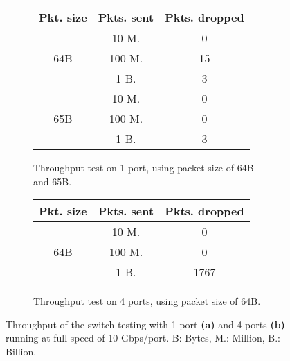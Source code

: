 \begin{figure}[h]
	\centering
	\begin{subfigure}[t]{0.45\textwidth}
		\begin{tabular}{|c|c|c|}
			\hline
			Pkt. size            & \multicolumn{1}{c|}{Pkts. sent} & \multicolumn{1}{c|}{Pkts. dropped} \\ \hline
			\multirow{3}{*}{64B} & 10 M.                             & 0                                  \\ \cline{2-3} 
			& 100 M.                            & 15                                 \\ \cline{2-3} 
			& 1 B.                              & 3                                  \\ \hline
			\multirow{3}{*}{65B} & 10 M.                             & 0                                  \\ \cline{2-3} 
			& 100 M.                            & 0                                  \\ \cline{2-3} 
			& 1 B.                              & 3                                  \\ \hline
		\end{tabular}
		\caption{Throughput test on 1 port, using packet size of 64B and 65B.}
		\label{fig:oneport}
	\end{subfigure}
	\hfill
	\begin{subfigure}[t]{0.45\textwidth}
		\begin{tabular}{|c|c|c|}
			\hline
			Pkt. size            & \multicolumn{1}{c|}{Pkts. sent} & \multicolumn{1}{c|}{Pkts. dropped} \\ \hline
			\multirow{3}{*}{64B} & 10 M.                             & 0                                  \\ \cline{2-3} 
			& 100 M.                            & 0                                  \\ \cline{2-3} 
			& 1 B.                              & 1767                               \\ \hline
		\end{tabular}
		\caption{Throughput test on 4 ports, using packet size of 64B.}
		\label{fig:fourport}
	\end{subfigure}
	\caption{Throughput of the switch testing with 1 port \textbf{(a)} and 4 ports \textbf{(b)} running at full speed of 10 Gbps/port. B: Bytes, M.: Million, B.: Billion.}
	\label{fig:throughput}
\end{figure}

